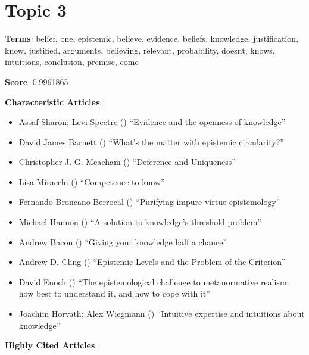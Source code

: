 \documentclass[
  10pt,
  letterpaper,
  DIV=11,
  numbers=noendperiod,
  twoside]{scrartcl}
\providecommand{\tightlist}{%
  \setlength{\itemsep}{0pt}\setlength{\parskip}{0pt}}\usepackage{longtable,booktabs,array}
\begin{document}
\section{Topic 3}\label{topic-3}

\textbf{Terms}: belief, one, epistemic, believe, evidence, beliefs,
knowledge, justification, know, justified, arguments, believing,
relevant, probability, doesnt, knows, intuitions, conclusion, premise,
come

\textbf{Score}: 0.9961865

\textbf{Characteristic Articles}:

\begin{itemize}
\tightlist
\item
  Assaf Sharon; Levi Spectre ()
  ``Evidence and the openness of knowledge''
\item
  David James Barnett () ``What's
  the matter with epistemic circularity?''
\item
  Christopher J. G. Meacham ()
  ``Deference and Uniqueness''
\item
  Lisa Miracchi () ``Competence
  to know''
\item
  Fernando Broncano-Berrocal ()
  ``Purifying impure virtue epistemology''
\item
  Michael Hannon () ``A solution
  to knowledge's threshold problem''
\item
  Andrew Bacon () ``Giving your
  knowledge half a chance''
\item
  Andrew D. Cling () ``Epistemic
  Levels and the Problem of the Criterion''
\item
  David Enoch () ``The
  epistemological challenge to metanormative realism: how best to
  understand it, and how to cope with it''
\item
  Joachim Horvath; Alex Wiegmann
  ()
  ``Intuitive expertise and intuitions about knowledge''
\end{itemize}

\textbf{Highly Cited Articles}:
\end{document}
